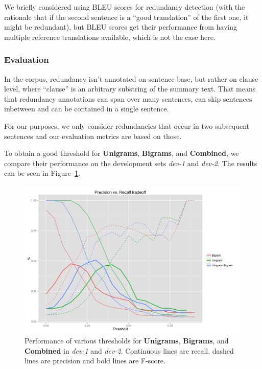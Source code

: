\documentclass[a4paper,10pt]{scrartcl}
\theoremstyle{style}
\begin{document}
We briefly considered using BLEU scores \citep{papineni2002bleu} for redundancy detection (with the rationale that if the second sentence is a ``good translation'' of the first one, it might be redundant), but BLEU scores get their performance from having multiple reference translations available, which is not the case here.

\subsubsection{Evaluation}

In the corpus, redundancy isn't annotated on sentence base, but rather on clause level, where ``clause'' is an arbitrary substring of the summary text. That means that redundancy annotations can span over many sentences, can skip sentences inbetween and can be contained in a single sentence.

For our purposes, we only consider redundancies that occur in two subsequent sentences and our evaluation metrics are based on those.

To obtain a good threshold for \textbf{Unigrams}, \textbf{Bigrams}, and \textbf{Combined}, we compare their performance on the development sets \textit{dev-1} and \textit{dev-2}. The results can be seen in Figure~\ref{redundancy_graph}.

\begin{figure}
\begin{center}
\includegraphics[scale=0.15]{a.png}
\end{center}
\caption{Performance of various thresholds for \textbf{Unigrams}, \textbf{Bigrams}, and \textbf{Combined} in \textit{dev-1} and \textit{dev-2}. Continuous lines are recall, dashed lines are precision and bold lines are F-score.}
\label{redundancy_graph}
\end{figure}
\end{document}
